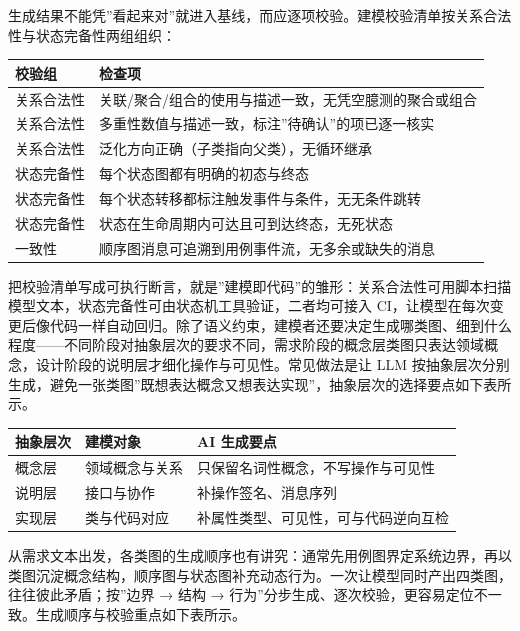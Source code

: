 \documentclass[
]{ctexbook}
\newcounter{none}
\begin{document}
生成结果不能凭''看起来对''就进入基线，而应逐项校验。建模校验清单按关系合法性与状态完备性两组组织：

{\def\LTcaptype{none} %
\begin{longtable}[]{@{}ll@{}}
\toprule\noalign{}
校验组 & 检查项 \\
\midrule\noalign{}
\endhead
\bottomrule\noalign{}
\endlastfoot
关系合法性 & 关联/聚合/组合的使用与描述一致，无凭空臆测的聚合或组合 \\
关系合法性 & 多重性数值与描述一致，标注''待确认''的项已逐一核实 \\
关系合法性 & 泛化方向正确（子类指向父类），无循环继承 \\
状态完备性 & 每个状态图都有明确的初态与终态 \\
状态完备性 & 每个状态转移都标注触发事件与条件，无无条件跳转 \\
状态完备性 & 状态在生命周期内可达且可到达终态，无死状态 \\
一致性 & 顺序图消息可追溯到用例事件流，无多余或缺失的消息 \\
\end{longtable}
}

把校验清单写成可执行断言，就是''建模即代码''的雏形：关系合法性可用脚本扫描模型文本，状态完备性可由状态机工具验证，二者均可接入
CI，让模型在每次变更后像代码一样自动回归。除了语义约束，建模者还要决定生成哪类图、细到什么程度------不同阶段对抽象层次的要求不同，需求阶段的概念层类图只表达领域概念，设计阶段的说明层才细化操作与可见性。常见做法是让
LLM
按抽象层次分别生成，避免一张类图''既想表达概念又想表达实现''，抽象层次的选择要点如下表所示。

{\def\LTcaptype{none} %
\begin{longtable}[]{@{}lll@{}}
\toprule\noalign{}
抽象层次 & 建模对象 & AI 生成要点 \\
\midrule\noalign{}
\endhead
\bottomrule\noalign{}
\endlastfoot
概念层 & 领域概念与关系 & 只保留名词性概念，不写操作与可见性 \\
说明层 & 接口与协作 & 补操作签名、消息序列 \\
实现层 & 类与代码对应 & 补属性类型、可见性，可与代码逆向互检 \\
\end{longtable}
}

从需求文本出发，各类图的生成顺序也有讲究：通常先用例图界定系统边界，再以类图沉淀概念结构，顺序图与状态图补充动态行为。一次让模型同时产出四类图，往往彼此矛盾；按''边界
→ 结构 →
行为''分步生成、逐次校验，更容易定位不一致。生成顺序与校验重点如下表所示。
\end{document}
